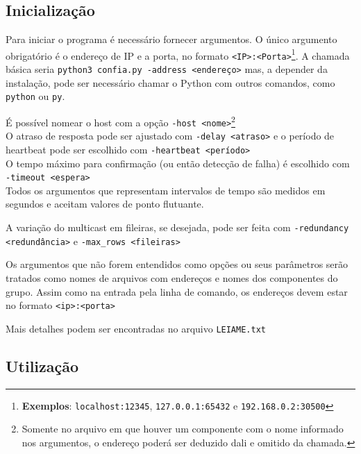 \documentclass[12pt,twocolumn]{article}
\begin{document}
		\subsection{Inicialização}
		
			Para iniciar o programa é necessário fornecer argumentos.   	
			O único argumento obrigatório é o endereço de IP e a porta, no formato \texttt{<IP>:<Porta>}\footnote{\textbf{Exemplos}: \texttt{localhost:12345}, \texttt{127.0.0.1:65432} e \texttt{192.168.0.2:30500}}.
			A chamada básica seria \texttt{python3 confia.py -address <endereço>} mas, a depender da instalação, pode ser necessário chamar o Python com outros comandos, como \texttt{python} ou \texttt{py}.
			
			É possível nomear o host com a opção \texttt{-host <nome>}\footnote{Somente no arquivo em que houver um componente com o nome informado nos argumentos, o endereço poderá ser deduzido dali e omitido da chamada.} \\
			O atraso de resposta pode ser ajustado com \texttt{-delay <atraso>} e o período de heartbeat pode ser escolhido com \texttt{-heartbeat <período>}  \\
			O tempo máximo para confirmação (ou então detecção de falha) é escolhido com \texttt{-timeout <espera>} \\ 
			Todos os argumentos que representam intervalos de tempo são medidos em segundos e aceitam valores de ponto flutuante.
			
			A variação do multicast em fileiras, se desejada, pode ser feita com \texttt{-redundancy <redundância>} e \texttt{-max\_rows <fileiras>}
			
			Os argumentos que não forem entendidos como opções ou seus parâmetros serão tratados como nomes de arquivos com endereços e nomes dos componentes do grupo.
			Assim como na entrada pela linha de comando, os endereços devem estar no formato \texttt{<ip>:<porta>}
			
			Mais detalhes podem ser encontradas no arquivo \texttt{LEIAME.txt}
			
			
			
		\subsection{Utilização}	
		
\end{document}
